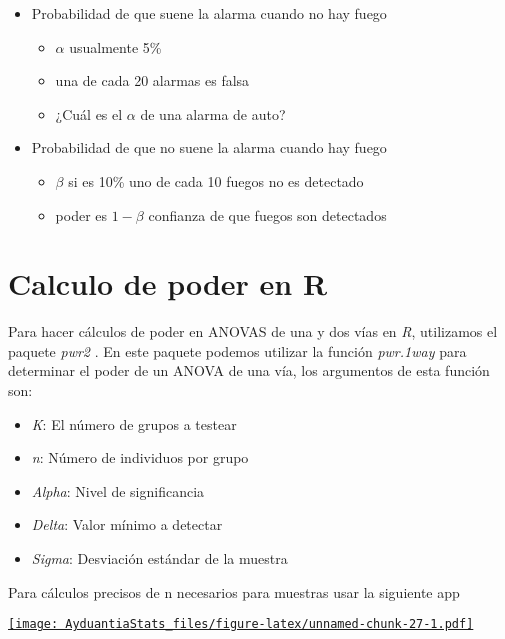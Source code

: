 \documentclass[]{book}
\providecommand{\tightlist}{%
  \setlength{\itemsep}{0pt}\setlength{\parskip}{0pt}}
\begin{document}
\begin{itemize}
\tightlist
\item
  Probabilidad de que suene la alarma cuando no hay fuego

  \begin{itemize}
  \tightlist
  \item
    \(\alpha\) usualmente 5\%
  \item
    una de cada 20 alarmas es falsa
  \item
    ¿Cuál es el \(\alpha\) de una alarma de auto?
  \end{itemize}
\item
  Probabilidad de que no suene la alarma cuando hay fuego

  \begin{itemize}
  \tightlist
  \item
    \(\beta\) si es 10\% uno de cada 10 fuegos no es detectado
  \item
    poder es \(1-\beta\) confianza de que fuegos son detectados
  \end{itemize}
\end{itemize}

\hypertarget{calculo-de-poder-en-r}{%
\section{Calculo de poder en R}\label{calculo-de-poder-en-r}}

Para hacer cálculos de poder en ANOVAS de una y dos vías en \emph{R}, utilizamos el paquete \emph{pwr2} \citep{Pengcheng2017}. En este paquete podemos utilizar la función \emph{pwr.1way} para determinar el poder de un ANOVA de una vía, los argumentos de esta función son:

\begin{itemize}
\tightlist
\item
  \emph{K}: El número de grupos a testear
\item
  \emph{n}: Número de individuos por grupo
\item
  \emph{Alpha}: Nivel de significancia
\item
  \emph{Delta}: Valor mínimo a detectar
\item
  \emph{Sigma}: Desviación estándar de la muestra
\end{itemize}

Para cálculos precisos de n necesarios para muestras usar la siguiente app

\href{http://admin.derek-corcoran-barrios.com/shiny/rstudio/sample-apps/Shiny3/}{\texttt{[image: AyduantiaStats\_files/figure-latex/unnamed-chunk-27-1.pdf]}}
\end{document}
